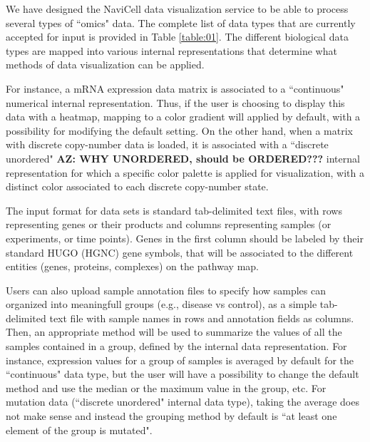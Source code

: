 \documentclass[a4,center,fleqn]{NAR}
\begin{document}
We have designed the NaviCell data visualization service to be able to process
several types of ``omics" data. The complete list of data types that are
currently accepted for input is provided in Table \ref{table:01}. The different biological data
types are mapped into various internal representations that determine what methods
of data visualization can be applied. 

For instance, a mRNA expression data matrix is associated to a
``continuous" numerical internal representation. Thus, if the user is choosing to display
this data with a heatmap, mapping to a color gradient will applied by default, with a possibility 
for modifying the default setting. On the other hand, when a
matrix with discrete copy-number data is loaded, it is associated with a
``discrete unordered" {\bf AZ: WHY UNORDERED, should be ORDERED???} internal representation for which 
a specific color palette is applied for visualization, 
with a distinct color associated to each discrete copy-number state.

The input format for data sets is standard tab-delimited text files, with rows
representing genes or their products and columns representing samples (or experiments, or time
points). Genes in the first column should be labeled by their standard HUGO (HGNC)
gene symbols, that will be associated to the different entities (genes,
proteins, complexes) on the pathway map.

Users can also upload sample annotation files to specify how samples can organized into meaningfull groups 
(e.g., disease vs control), as a simple tab-delimited text file with sample names in
rows and annotation fields as columns. Then, an appropriate method will be used
to summarize the values of all the samples contained in a group, defined by the
internal data representation. For instance, expression values for a group of samples
is averaged by default for the ``continuous" data type, but the user will have
a possibility to change the default method and use the median or 
the maximum value in the group, etc. For mutation data (``discrete unordered" internal data type), 
taking the average does not make sense and instead the grouping method by default is
``at least one element of the group is mutated".
\end{document}
